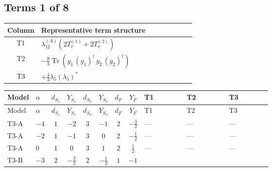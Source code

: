 \documentclass[8pt]{article}
\begin{document}
\begin{landscape}
\subsection*{Terms 1 of 8}
\begin{center}
\begin{tabular}{@{}c >{\raggedright\arraybackslash}p{0.82\linewidth}@{}}
\toprule
Column & Representative term structure \\
\midrule
T1 & \(\displaystyle {\lambda_{12}^{(A)}} (2 T_{\nu}^{(1)}+2 T_{\nu}^{(2)})\) \\
\midrule
T2 & \(\displaystyle -\frac{8}{3} \operatorname{Tr}\!\left({y_1}\,\left({y_1}\right)^{\dagger}\,{y_2}\,\left({y_2}\right)^{\dagger}\right)\) \\
\midrule
T3 & \(\displaystyle +\frac{4}{3} {\lambda_5} \left({\lambda_5}\right)^{*}\) \\
\midrule
\bottomrule
\end{tabular}
\end{center}
\smallskip
\tiny
\begin{longtable}{@{}llcccccc >{\raggedright\arraybackslash}p{0.21\linewidth} >{\raggedright\arraybackslash}p{0.21\linewidth} >{\raggedright\arraybackslash}p{0.21\linewidth}@{}}
\toprule
Model & $\alpha$ & $d_{S_1}$ & $Y_{S_1}$ & $d_{S_2}$ & $Y_{S_2}$ & $d_F$ & $Y_F$ & T1 & T2 & T3 \\
\midrule
\endfirsthead
\toprule
Model & $\alpha$ & $d_{S_1}$ & $Y_{S_1}$ & $d_{S_2}$ & $Y_{S_2}$ & $d_F$ & $Y_F$ & T1 & T2 & T3 \\
\midrule
\endhead
T3-A & $-4$ & $1$ & $-2$ & $3$ & $-1$ & $2$ & $-\frac{3}{2}$ & --- & --- & --- \\
\midrule
T3-A & $-2$ & $1$ & $-1$ & $3$ & $0$ & $2$ & $-\frac{1}{2}$ & --- & --- & --- \\
\midrule
T3-A & $0$ & $1$ & $0$ & $3$ & $1$ & $2$ & $\frac{1}{2}$ & --- & --- & --- \\
\midrule
T3-B & $-3$ & $2$ & $-\frac{3}{2}$ & $2$ & $-\frac{1}{2}$ & $1$ & $-1$ & \scriptsize\adjustbox{max width=\linewidth}{$\begin{gathered} {\lambda_{12}^{(A)}} (2 T_{\nu}^{(1)}+2 T_{\nu}^{(2)})\end{gathered}$} & \scriptsize\adjustbox{max width=\linewidth}{$\begin{gathered} -\frac{8}{3} \operatorname{Tr}\!\left({y_1}\,\left({y_1}\right)^{\dagger}\,{y_2}\,\left({y_2}\right)^{\dagger}\right)\end{gathered}$} & \scriptsize\adjustbox{max width=\linewidth}{$\begin{gathered} +\frac{4}{3} {\lambda_5} \left({\lambda_5}\right)^{*}\end{gathered}$} \\

\end{longtable}
\end{landscape}
\end{document}
